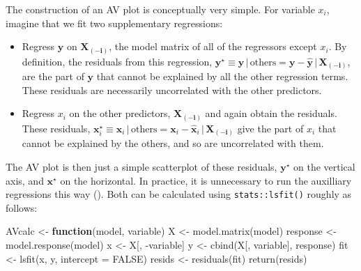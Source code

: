 \documentclass[
  letterpaper,
  10pt,
  krantz2]{krantz}
\makeatletter
\newenvironment{Shaded}{\begin{snugshade}}{\end{snugshade}}
\newcommand{\AttributeTok}[1]{\textcolor[rgb]{0.40,0.45,0.13}{#1}}
\newcommand{\ConstantTok}[1]{\textcolor[rgb]{0.56,0.35,0.01}{#1}}
\newcommand{\ControlFlowTok}[1]{\textcolor[rgb]{0.00,0.23,0.31}{\textbf{#1}}}
\newcommand{\FunctionTok}[1]{\textcolor[rgb]{0.28,0.35,0.67}{#1}}
\newcommand{\NormalTok}[1]{\textcolor[rgb]{0.00,0.23,0.31}{#1}}
\newcommand{\OtherTok}[1]{\textcolor[rgb]{0.00,0.23,0.31}{#1}}
\newcommand{\SpecialCharTok}[1]{\textcolor[rgb]{0.37,0.37,0.37}{#1}}
\newenvironment{kframe}{%
  \medskip{}
  \setlength{\fboxsep}{.8em}
  \def\at@end@of@kframe{}%
  \ifinner\ifhmode%
  \def\at@end@of@kframe{\end{minipage}}%
  \begin{minipage}{\columnwidth}%
  \fi\fi%
  \def\FrameCommand##1{\hskip\@totalleftmargin \hskip-\fboxsep
  \colorbox{shadecolor}{##1}\hskip-\fboxsep
      \hskip-\linewidth \hskip-\@totalleftmargin \hskip\columnwidth}%
  \MakeFramed {\advance\hsize-\width
    \@totalleftmargin\z@ \linewidth\hsize
    \@setminipage}}%
{\par\unskip\endMakeFramed%
  \at@end@of@kframe}
\renewenvironment{Shaded}{\begin{kframe}}{\end{kframe}}
\makeatother
\begin{document}
The construction of an AV plot is conceptually very simple. For variable
\(x_i\), imagine that we fit two supplementary regressions:

\begin{itemize}
\item
  Regress \(\mathbf{y}\) on \(\mathbf{X_{(-i)}}\), the model matrix of
  all of the regressors except \(x_i\). By definition, the residuals
  from this regression,
  \(\mathbf{y}^\star \equiv \mathbf{y} \,\vert\, \text{others} = \mathbf{y} - \widehat{\mathbf{y}} \,\vert\, \mathbf{X_{(-i)}}\),
  are the part of \(\mathbf{y}\) that cannot be explained by all the
  other regression terms. These residuals are necessarily uncorrelated
  with the other predictors.
\item
  Regress \(x_i\) on the other predictors, \(\mathbf{X_{(-i)}}\) and
  again obtain the residuals. These residuals,
  \(\mathbf{x}_i^\star \equiv \mathbf{x}_i \,\vert\, \text{others} = \mathbf{x}_i - \widehat{\mathbf{x}}_i \,\vert\, \mathbf{X_{(-i)}}\)
  give the part of \(x_i\) that cannot be explained by the others, and
  so are uncorrelated with them.
\end{itemize}

The AV plot is then just a simple scatterplot of these residuals,
\(\mathbf{y}^\star\) on the vertical axis, and \(\mathbf{x}^\star\) on
the horizontal. In practice, it is unnecessary to run the auxilliary
regressions this way (). Both can be calculated using \texttt{stats::lsfit()} roughly as
follows:

\begin{Shaded}
\begin{Highlighting}[]
\NormalTok{AVcalc }\OtherTok{\textless{}{-}} \ControlFlowTok{function}\NormalTok{(model, variable)}
\NormalTok{X }\OtherTok{\textless{}{-}} \FunctionTok{model.matrix}\NormalTok{(model)}
\NormalTok{response }\OtherTok{\textless{}{-}} \FunctionTok{model.response}\NormalTok{(model)}
\NormalTok{x }\OtherTok{\textless{}{-}}\NormalTok{ X[, }\SpecialCharTok{{-}}\NormalTok{variable]}
\NormalTok{y }\OtherTok{\textless{}{-}} \FunctionTok{cbind}\NormalTok{(X[, variable], response)}
\NormalTok{fit }\OtherTok{\textless{}{-}} \FunctionTok{lsfit}\NormalTok{(x, y, }\AttributeTok{intercept =} \ConstantTok{FALSE}\NormalTok{)}
\NormalTok{resids }\OtherTok{\textless{}{-}} \FunctionTok{residuals}\NormalTok{(fit)}
\FunctionTok{return}\NormalTok{(resids)}
\end{Highlighting}
\end{Shaded}
\end{document}
